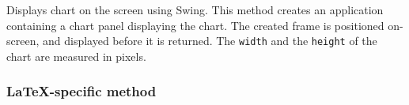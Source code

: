 \begin{tabb}
   Displays chart on the screen using Swing.
   This method creates an application containing a chart panel displaying
   the chart. The created frame is positioned on-screen, and displayed before
   it is returned. The \texttt{width} and the \texttt{height}
   of the chart are measured in pixels.
\end{tabb}
\begin{htmlonly}
\end{htmlonly}

\subsubsection*{\LaTeX-specific method}

